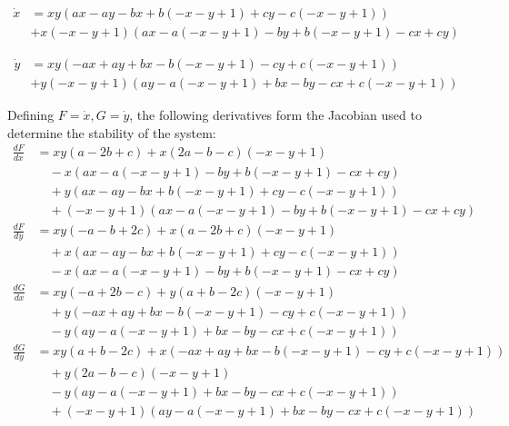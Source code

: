 \documentclass{article}
\begin{document}
\begin{equation}
    \begin{split}
        \dot{x} &= x y \left(a x - a y - b x + b \left(-x - y + 1\right) + c y 
        - c \left(-x - y + 1\right)\right) \\
        & + x \left(-x - y + 1\right) \left(a x - a \left(-x - y + 1\right)
        - b y + b \left(-x - y + 1\right) - c x + c y\right)
    \end{split}
\end{equation}

\begin{equation}
    \begin{split}
        \dot{y} &= x y \left(- a x + a y + b x - b \left(- x - y + 1\right) - c y 
        + c \left(- x - y + 1\right)\right) \\
        & + y \left(- x - y + 1\right) \left(a y - a \left(- x - y + 1\right)
        + b x - b y - c x + c \left(- x - y + 1\right)\right)
    \end{split}
\end{equation}


Defining $F = \dot x, G = \dot y$, the following derivatives form the Jacobian used to determine the stability of the system:
\begin{align}
    \frac{dF}{dx} &= x y (a - 2b + c) 
    + x (2a - b - c)(-x - y + 1) \nonumber \\
    &\quad - x \left(a x - a(-x - y + 1) - b y + b(-x - y + 1) - c x + c y\right) \nonumber \\
    &\quad + y \left(a x - a y - b x + b(-x - y + 1) + c y - c(-x - y + 1)\right) \nonumber \\
    &\quad + (-x - y + 1) \left(a x - a(-x - y + 1) - b y + b(-x - y + 1) - c x + c y\right) \\
    \frac{dF}{dy} &= x y (-a - b + 2c) 
    + x (a - 2b + c)(-x - y + 1) \nonumber \\
    &\quad + x \left(a x - a y - b x + b(-x - y + 1) + c y - c(-x - y + 1)\right) \nonumber \\
    &\quad - x \left(a x - a(-x - y + 1) - b y + b(-x - y + 1) - c x + c y\right) \\
    \frac{dG}{dx} &= x y (-a + 2b - c)
    + y (a + b - 2c)(-x -y + 1) \nonumber \\
    &\quad +y (-ax + ay + bx - b (-x -y + 1) - cy + c (-x-y+1)) \nonumber \\
    &\quad -y (ay - a(-x-y+1) + bx - by - cx + c(-x-y+1)) \\
    \frac{dG}{dy} &= x y (a + b - 2c)
    + x \left( -a x + a y + b x - b(-x - y + 1) - c y + c(-x - y + 1) \right) \nonumber \\
    &\quad + y (2a - b - c)(-x - y + 1) \nonumber \\
    &\quad - y \left( a y - a(-x - y + 1) + b x - b y - c x + c(-x - y + 1) \right) \nonumber \\
    &\quad + (-x - y + 1) \left( a y - a(-x - y + 1) + b x - b y - c x + c(-x - y + 1) \right)
\end{align}
\end{document}
